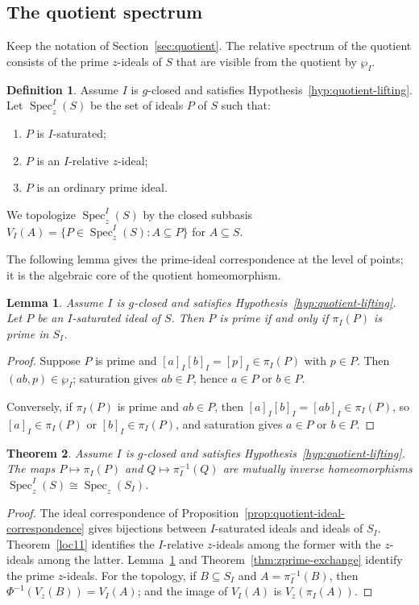 \documentclass[11pt,leqno]{amsart}
\theoremstyle{plain}
\newtheorem{theorem}{Theorem}[section]
\newtheorem{lemma}[theorem]{Lemma}
\theoremstyle{definition}
\newtheorem{definition}{Definition}[section]
\theoremstyle{remark}
\numberwithin{equation}{section}
\DeclareMathOperator{\Spec}{Spec}
\begin{document}
\subsection{The quotient spectrum}

Keep the notation of Section~\ref{sec:quotient}.
The relative spectrum of the quotient consists of the prime $z$-ideals
of $S$ that are visible from the quotient by $\wp_I$.

\begin{definition}\label{def:relative-z-spectrum}
Assume $I$ is $g$-closed and satisfies
Hypothesis~\ref{hyp:quotient-lifting}.
Let $\Spec_z^I(S)$ be the set of ideals $P$ of $S$ such that:
\begin{enumerate}[label=\textup{(Q\arabic*)}]
\item $P$ is $I$-saturated;
\item $P$ is an $I$-relative $z$-ideal;
\item $P$ is an ordinary prime ideal.
\end{enumerate}
We topologize $\Spec_z^I(S)$ by the closed subbasis
$V_I(A)=\{P\in\Spec_z^I(S):A\subseteq P\}$ for $A\subseteq S$.
\end{definition}

The following lemma gives the prime-ideal correspondence at the
level of points; it is the algebraic core of the quotient homeomorphism.

\begin{lemma}\label{lem:quotient-prime-correspondence}
Assume $I$ is $g$-closed and satisfies
Hypothesis~\ref{hyp:quotient-lifting}.
Let $P$ be an $I$-saturated ideal of $S$.
Then $P$ is prime if and only if $\pi_I(P)$ is prime in $S_I$.
\end{lemma}
\begin{proof}
Suppose $P$ is prime and $[a]_I[b]_I=[p]_I\in\pi_I(P)$ with $p\in P$.
Then $(ab,p)\in\wp_I$; saturation gives $ab\in P$,
hence $a\in P$ or $b\in P$.

Conversely, if $\pi_I(P)$ is prime and $ab\in P$,
then $[a]_I[b]_I=[ab]_I\in\pi_I(P)$,
so $[a]_I\in\pi_I(P)$ or $[b]_I\in\pi_I(P)$,
and saturation gives $a\in P$ or $b\in P$.
\end{proof}

\begin{theorem}\label{thm:quotient-z-spectrum-homeomorphism}
Assume $I$ is $g$-closed and satisfies
Hypothesis~\ref{hyp:quotient-lifting}.
The maps $P\mapsto\pi_I(P)$ and $Q\mapsto\pi_I^{-1}(Q)$ are
mutually inverse homeomorphisms $\Spec_z^I(S)\cong\Spec_z(S_I)$.
\end{theorem}
\begin{proof}
The ideal correspondence of Proposition~\ref{prop:quotient-ideal-correspondence}
gives bijections between $I$-saturated ideals and ideals of $S_I$.
Theorem~\ref{loc11} identifies the $I$-relative $z$-ideals among
the former with the $z$-ideals among the latter.
Lemma~\ref{lem:quotient-prime-correspondence} and
Theorem~\ref{thm:zprime-exchange} identify the prime $z$-ideals.
For the topology, if $B\subseteq S_I$ and $A=\pi_I^{-1}(B)$,
then $\Phi^{-1}(V_z(B))=V_I(A)$;
and the image of $V_I(A)$ is $V_z(\pi_I(A))$.
\end{proof}
\end{document}
